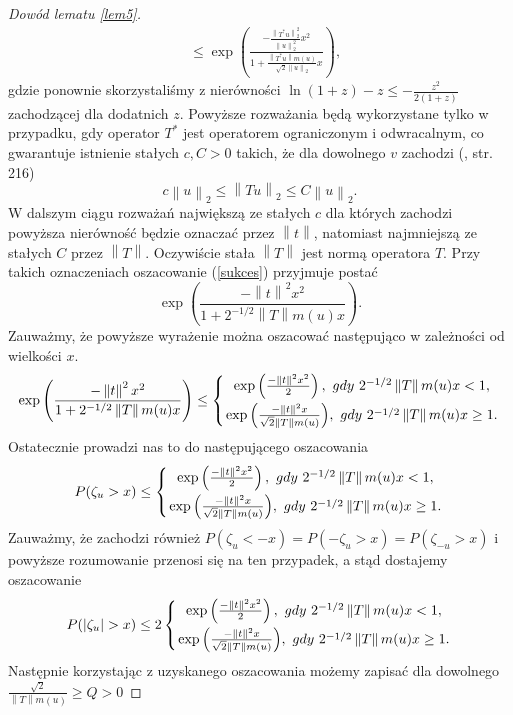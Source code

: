 \documentclass[man,mfiu]{mgrwms}
\newcommand{\norm}[1]{\left\lVert#1\right\rVert}
\begin{document}
\begin{proof}[Dowód lematu \ref{lem5}]
\begin{equation}
\begin{split}
&\leq \exp\left(\frac{-\frac{\norm{T^*u}_2^2}{\norm{u}^2_2}x^2}{1+\frac{\norm{T^*u}m(u)}{\sqrt{2}\norm{u}_2}x}\right),
\end{split}
\end{equation}
gdzie ponownie skorzystaliśmy z nierówności $\ln (1+z)-z\leq -\frac{z^2}{2(1+z)}$ zachodzącej dla dodatnich $z$.
Powyższe rozważania będą wykorzystane tylko w przypadku, gdy operator $T^*$ jest operatorem ograniczonym i odwracalnym, co gwarantuje istnienie stałych $c,C>0$ takich, że dla dowolnego $v$ zachodzi (\cite{sobolev}, str. 216)
\begin{displaymath}
c\norm{u}_2\leq \norm{Tu}_2\leq C\norm{u}_2.
\end{displaymath}
W dalszym ciągu rozważań największą ze stałych $c$ dla których zachodzi powyższa nierówność będzie oznaczać przez $\norm{t}$, natomiast najmniejszą ze stałych $C$ przez $\norm{T}$. Oczywiście stała $\norm{T}$ jest normą operatora $T$. Przy takich oznaczeniach oszacowanie (\ref{sukces}) przyjmuje postać 
\begin{displaymath}
\exp\left(\frac{-\norm{t}^2x^2}{1+2^{-1/2}\norm{T}m(u)x}\right).
\end{displaymath}
Zauważmy, że powyższe wyrażenie można oszacować następująco w zależności od wielkości $x$.
\begin{displaymath}
\exp\left(\frac{-\norm{t}^2x^2}{1+2^{-1/2}\norm{T}m(u)x}\right)\leq \left\{{\exp\left(\frac{-\norm{t}^2x^2}{2}\right),\ gdy\ 2^{-1/2}\norm{T}m(u)x<1,}\atop {\exp\left(\frac{-\norm{t}^2x}{\sqrt{2}\norm{T}m(u)}\right)},\ gdy\ 2^{-1/2}\norm{T}m(u)x\geq 1.\right.
\end{displaymath}
Ostatecznie prowadzi nas to do następującego oszacowania
\begin{displaymath}
P(\zeta_u>x)\leq \left\{{\exp\left(\frac{-\norm{t}^2x^2}{2}\right),\ gdy\ 2^{-1/2}\norm{T}m(u)x<1,}\atop {\exp\left(\frac{-\norm{t}^2x}{\sqrt{2}\norm{T}m(u)}\right)},\ gdy\ 2^{-1/2}\norm{T}m(u)x\geq 1.\right.
\end{displaymath}
Zauważmy, że zachodzi również $P(\zeta_u <-x)=P(-\zeta_u>x)=P(\zeta_{-u}>x)$ i powyższe rozumowanie przenosi się na ten przypadek, a stąd dostajemy oszacowanie 
\begin{displaymath}
P(|\zeta_u|>x)\leq 2\left\{{\exp\left(\frac{-\norm{t}^2x^2}{2}\right),\ gdy\ 2^{-1/2}\norm{T}m(u)x<1,}\atop {\exp\left(\frac{-\norm{t}^2x}{\sqrt{2}\norm{T}m(u)}\right)},\ gdy\ 2^{-1/2}\norm{T}m(u)x\geq 1.\right.
\end{displaymath}
Następnie korzystając z uzyskanego oszacowania możemy zapisać dla dowolnego\\ $\frac{\sqrt{2}}{\norm{T}m(u)}\geq Q>0$

\end{proof}
\end{document}
